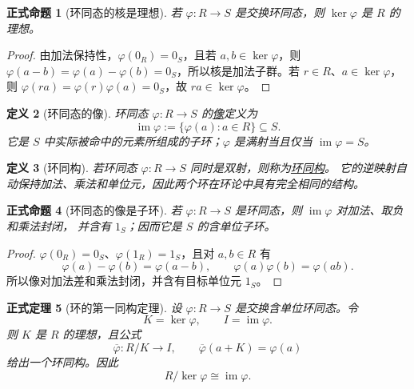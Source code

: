 \documentclass[UTF8,fontset=none,a4paper,11pt]{ctexart}
\theoremstyle{foundation-definition}
\newtheorem{definition}{定义}[section]
\theoremstyle{foundation-theorem}
\newtheorem{theorem}[definition]{正式定理}
\theoremstyle{foundation-proposition}
\newtheorem{proposition}[definition]{正式命题}
\theoremstyle{foundation-example}
\theoremstyle{foundation-remark}
\theoremstyle{foundation-theorem}
\newcommand{\term}[2]{\hyperref[#1]{#2}}
\begin{document}
\begin{proposition}[环同态的核是理想]\label{prop:ring-kernel-ideal}
若 \(\varphi:R\to S\) 是交换环同态，则 \(\ker\varphi\) 是 \(R\) 的理想。
\end{proposition}

\begin{proof}
由加法保持性，\(\varphi(0_R)=0_S\)，且若 \(a,b\in\ker\varphi\)，则
\(\varphi(a-b)=\varphi(a)-\varphi(b)=0_S\)，所以核是加法子群。若 \(r\in R\)、\(a\in\ker\varphi\)，则
\(\varphi(ra)=\varphi(r)\varphi(a)=0_S\)，故 \(ra\in\ker\varphi\)。
\end{proof}

\begin{definition}[环同态的像]\label{def:ring-image}
环同态 \(\varphi:R\to S\) 的\term{def:ring-image}{像}定义为
\[
  \operatorname{im}\varphi:=\{\varphi(a):a\in R\}\subseteq S.
\]
它是 \(S\) 中实际被命中的元素所组成的子环；\(\varphi\) 是满射当且仅当
\(\operatorname{im}\varphi=S\)。
\end{definition}

\begin{definition}[环同构]\label{def:ring-isomorphism}
若环同态 \(\varphi:R\to S\) 同时是双射，则称为\term{def:ring-isomorphism}{环同构}。
它的逆映射自动保持加法、乘法和单位元，因此两个环在环论中具有完全相同的结构。
\end{definition}

\begin{proposition}[环同态的像是子环]\label{prop:ring-image-subring}
若 \(\varphi:R\to S\) 是环同态，则 \(\operatorname{im}\varphi\) 对加法、取负和乘法封闭，
并含有 \(1_S\)；因而它是 \(S\) 的含单位子环。
\end{proposition}

\begin{proof}
\(\varphi(0_R)=0_S\)、\(\varphi(1_R)=1_S\)，且对 \(a,b\in R\) 有
\[
\varphi(a)-\varphi(b)=\varphi(a-b),\qquad
\varphi(a)\varphi(b)=\varphi(ab).
\]
所以像对加法差和乘法封闭，并含有目标单位元 \(1_S\)。
\end{proof}

\begin{theorem}[环的第一同构定理]\label{thm:ring-first-isomorphism}
设 \(\varphi:R\to S\) 是交换含单位环同态。令
\[
K=\ker\varphi,\qquad I=\operatorname{im}\varphi.
\]
则 \(K\) 是 \(R\) 的理想，且公式
\[
\overline{\varphi}:R/K\longrightarrow I,\qquad
\overline{\varphi}(a+K)=\varphi(a)
\]
给出一个环同构。因此
\[
R/\ker\varphi\cong\operatorname{im}\varphi.
\]
\end{theorem}
\end{document}
